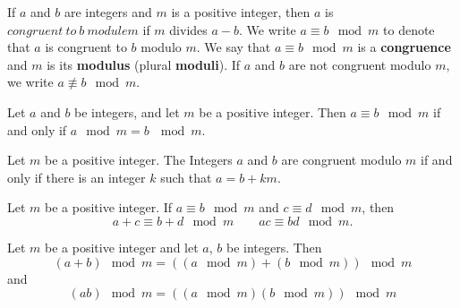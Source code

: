 \newcommand{\modulusDef}{
    \begin{definition}
        If $a$ and $b$ are integers and $m$ is a positive integer, then $a$ is $congruent\ to\ b\ module m$ if $m$ divides $a - b$. We write $a \equiv b\mod m$ to denote that $a$ is congruent to $b$ modulo $m$. We say that $a \equiv b \mod m$ is a \textbf{congruence} and $m$ is its \textbf{modulus} (plural \textbf{moduli}). If $a$ and $b$ are not congruent modulo $m$, we write $a \not\equiv b \mod m$.
    \end{definition}
}  

\newcommand{\modulusThm}{
    \begin{theorem}
        Let $a$ and $b$ be integers, and let $m$ be a positive integer. Then $a \equiv b \mod m$ if and only if $a \mod m = b\ \mod m$.
    \end{theorem}
}

\newcommand{\reminderModulusThm}{
    \begin{theorem}
        Let $m$ be a positive integer. The Integers $a$ and $b$ are congruent modulo $m$ if and only if there is an integer $k$ such that $a = b + km$.
    \end{theorem}
}

\newcommand{\mulAddModulusThm}{
    \begin{theorem}
        Let $m$ be a positive integer. If $a \equiv b \mod m$ and $c \equiv d \mod m$, then
    \begin{equation*}
        a + c \equiv b + d \mod m \qquad ac \equiv bd \mod m.
    \end{equation*}
    \end{theorem}
}

\newcommand{\modulusDistributCor}{
    \begin{corollary}
        Let $m$ be a positive integer and let $a$, $b$ be integers. Then
        \begin{equation*}
            (a + b)\mod{m} = ((a \mod{m}) + (b \mod{m}))\mod{m}            
        \end{equation*}
        and
        \begin{equation*}
            (ab)\mod{m} = ((a \mod{m})(b \mod{m}))\mod{m}
        \end{equation*}
    \end{corollary}
}


\divisorDef
\divisibilityThm
\compoundDivisibility
\divisionAlgThm
\divisorDividentDef
\modulusDef

\modulusThm
\reminderModulusThm
\mulAddModulusThm
\modulusDistributCor


